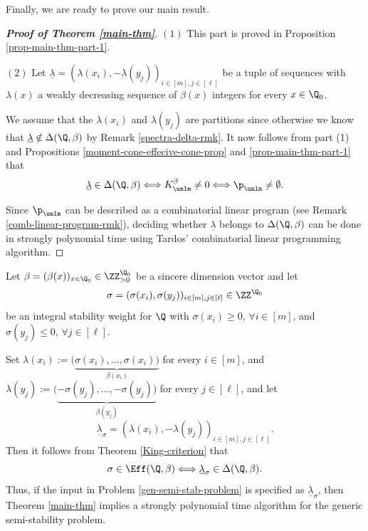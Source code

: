 Finally, we are ready to prove our main result.

\begin{proof}[\textbf{Proof of Theorem \ref{main-thm}}] $(1)$ This part is proved in Proposition \ref{prop-main-thm-part-1}.

$(2)$ Let $\underline{\lambda}=(\lambda(x_i), -\lambda(y_j))_{i \in [m], j \in [\ell]}$ be a tuple of sequences with $\lambda(x)$ a weakly decreasing sequence of $\beta(x)$ integers for every $x \in \Q_0$.

We assume that the $\lambda(x_i)$ and $\lambda(y_j)$ are partitions since otherwise we know that $\underline{\lambda} \notin \Delta(\Q, \beta)$ by Remark \ref{spectra-delta-rmk}. It now follows from part (1) and Propositions \ref{moment-cone-effecive-cone-prop} and \ref{prop-main-thm-part-1} that
$$
\underline{\lambda} \in \Delta(\Q, \beta) \Longleftrightarrow K^{\beta}_{\unlm} \neq 0 \Longleftrightarrow \p_{\unlm} \neq \emptyset.
$$

Since $\p_{\unlm}$ can be described as a combinatorial linear program (see Remark \ref{comb-linear-program-rmk}), deciding whether $\underline{\lambda}$ belongs to $\Delta(\Q, \beta)$ can be done in strongly polynomial time using Tardos' \cite{Tar86} combinatorial linear programming algorithm.
\end{proof}


\begin{rema}\label{rmk-non-natural-input-form} Let $\beta=(\beta(x))_{x \in \Q_0 } \in \ZZ_{>0}^{\Q_0}$ be a sincere dimension vector and let 
\[
\sigma=(\sigma(x_i), \sigma(y_j))_{i \in [m], j \in [\ell]} \in \ZZ^{\Q_0}
\]
be an integral stability weight for $\Q$ with $\sigma(x_i) \geq 0$, $\forall i \in [m]$, and $\sigma(y_j) \leq 0$, $\forall j \in [\ell]$. 

Set $\lambda(x_i):=(\underbrace{\sigma(x_i), \ldots, \sigma(x_i))}_{\beta(x_i)}$ for every $i \in [m]$, and $\lambda(y_j):=(\underbrace{-\sigma(y_j), \ldots, -\sigma(y_j))}_{\beta(y_j)}$ for every $j \in [\ell]$, and let 
$$
\underline{\lambda}_{\sigma}=(\lambda(x_i), -\lambda(y_j))_{i \in [m], j \in [\ell]}.
$$
Then it follows from Theorem \ref{King-criterion} that
$$
\sigma \in \Eff(\Q, \beta) \Longleftrightarrow \underline{\lambda}_{\sigma} \in \Delta(\Q, \beta).
$$
Thus, if the input in Problem \ref{gen-semi-stab-problem}  is specified as $\underline{\lambda}_{\sigma}$, then Theorem \ref{main-thm} implies a strongly polynomial time algorithm for the generic semi-stability problem.  
\end{rema}


